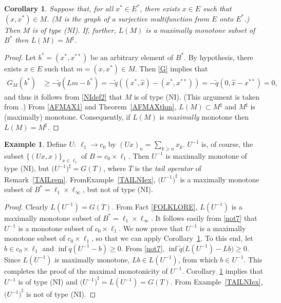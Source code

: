 \documentclass[letterpaper]{article}
\theoremstyle{plain}
\newtheorem{corollary}[theorem]{Corollary}
\theoremstyle{definition}
\newtheorem{example}[theorem]{Example}
\numberwithin{equation}{section}
\newcommand{\dbs}{^{**}}
\newcommand{\qt}{\wt q}
\newcommand{\wh}{\widehat}
\newcommand{\wt}{\widetilde}
\newcommand{\Cor}{Corollary~\ref}
\newcommand{\Ex}{Example~\ref}
\newcommand{\Rem}{Remark~\ref}
\newcommand{\Thm}{Theorem~\ref}
\begin{document}
\begin{corollary}\label{SURlem}
Suppose that,  for all $x^* \in E^*$, there exists $x \in E$ such that $(x,x^*) \in M$.   {\em ($M$ is the graph of a {\em surjective} multifunction from $E$ onto $E^*$.)}   Then $M$ is of type (NI).   If, further, $L(M)$ is a maximally monotone subset of $B^*$ then $L(M) = M^\sharp$.
\end{corollary}
\begin{proof}
Let $b^* = (x^*,x\dbs)$ be an arbitrary element of $B^*$.   By hypothesis,  there exists $x \in E$ such that $m = (x,x^*) \in M$. 
Then \eqref{G} implies that   
%
\begin{align*}
G_M(b^*) &\ge - \qt(Lm - b^*) = - \qt((x^*,\wh x) - (x^*,x\dbs)) = - \qt(0,\wh x - x\dbs) = 0,
\end{align*}   
%
and thus it follows from \eqref{NIdef2} that $M$ is of type (NI).  \big(This argument is taken from \cite[Corollary 7.9, p.\ 1034]{PARTONE}.\big)   From \eqref{AFMAX1} and \Thm{AFMAXthm}, $L(M) \subset M^\sharp$ and  $M^\sharp$ is (maximally) monotone.   Consequently, if $L(M)$ is {\em maximally} monotone then $L(M) = M^\sharp$.
\end{proof}
\begin{example}\label{TAILGex}
Define $U\colon\ \ell_1 \to c_0$ by $(Ux)_n = \sum_{k \ge n} x_k$.   $U^{-1}$ is, of course, the subset $\big\{(Ux,x)\big\}_{x \in \ell_1}$ of  $B = c_0 \times \ell_1$.  Then $U^{-1}$ is maximally monotone of type (NI), but $\big({U^{-1}}\big)^\sharp = G(T)$, where $T$ is the {\em tail operator} of \Rem{TAILrem}.   From\break \Ex{TAILNIex}, ${\big({U^{-1}}\big)}^\sharp$ is a maximally monotone subset of $B^* = \ell_1 \times \ell_\infty$, but not of type (NI).
\end{example}
%
\begin{proof}
  Clearly $L(U^{-1}) = G(T)$.  From Fact \ref{FOLKLORE}, $L(U^{-1})$ is a maximally monotone subset of $B^* = \ell_1 \times \ell_\infty$. It follows easily from \eqref{not7} that $U^{-1}$ is a monotone subset of $c_0 \times \ell_1$.   We now prove that $U^{-1}$ is a maximally monotone subset of $c_0 \times \ell_1$, so that we can apply \Cor{SURlem}.   To this end, let $b \in c_0 \times \ell_1$ and $\inf q(U^{-1} - b) \ge 0$.   From \eqref{not7}, $\inf \qt\big(L(U^{-1}) - Lb\big) \ge 0$.   Since $L(U^{-1})$ is maximally monotone, $Lb \in L(U^{-1})$, from which $b \in U^{-1}$.   This completes the proof of the maximal monotonicity of $U^{-1}$.   \Cor{SURlem} implies that $U^{-1}$ is of type (NI) and ${\big({U^{-1}}\big)}^\sharp = L(U^{-1}) = G(T)$.   From \Ex{TAILNIex}, ${\big({U^{-1}}\big)}^\sharp$ is not of type (NI).
\end{proof}
\end{document}
